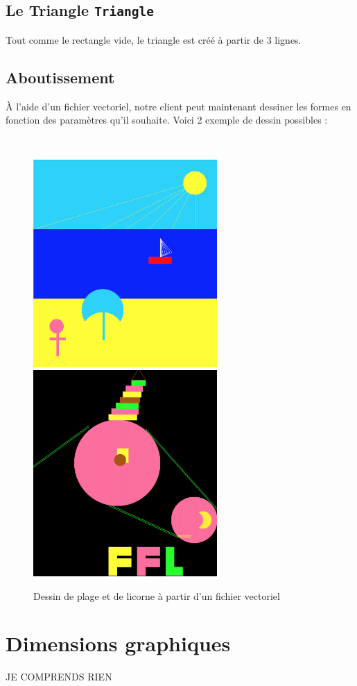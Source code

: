 \documentclass[11pt]{article}
\begin{document}
\subsection{Le Triangle \texttt{Triangle}}

Tout comme le rectangle vide, le triangle est créé à partir de 3 lignes.

\clearpage

\subsection{ Aboutissement }

À l'aide d'un fichier vectoriel, notre client peut maintenant dessiner les formes en fonction des paramètres qu'il souhaite. Voici 2 exemple de dessin possibles :

\
\

\begin{figure}[!htbp]
    \begin{center}
        \includegraphics[width=7cm]{plage.jpg}
        \includegraphics[width=7cm]{licorne.jpg}
        \caption{Dessin de plage et de licorne à partir d'un fichier vectoriel}
    \centering
    \end{center}
\end{figure}

\section{Dimensions graphiques}

JE COMPRENDS RIEN
\end{document}
